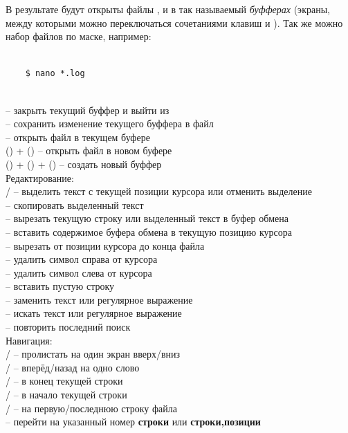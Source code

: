 В результате будут открыты файлы ,  и  в так называемый \textit{буфферах} (экраны, между которыми можно переключаться сочетаниями клавиш  и ). Так же можно набор файлов по маске, например:
\begin{lstlisting}
	
	$ nano *.log
	
\end{lstlisting}	

\noindent
{} -- закрыть текущий буффер и выйти из \\
 -- сохранить изменение текущего буффера в файл\\
 -- открыть файл в текущем буфере\\
()  + () -- открыть файл в новом буфере\\
()  + () + () -- создать новый буффер\\


\noindent
{\large{Редактирование:}}\\
/ -- выделить текст с текущей позиции курсора или отменить выделение\\
 -- скопировать выделенный текст\\
 -- вырезать текущую строку или выделенный текст в буфер обмена\\
 -- вставить содержимое буфера обмена в текущую позицию курсора\\
 -- вырезать от позиции курсора до конца файла\\
 -- удалить символ справа от курсора\\
 -- удалить символ слева от курсора\\
 -- вставить пустую строку\\
 -- заменить текст или регулярное выражение\\
 -- искать текст или регулярное выражение\\
 -- повторить последний поиск\\

\noindent
{\large{Навигация:}}\\
/ -- пролистать на один экран вверх/вниз\\
/ -- вперёд/назад  на одно слово\\
/ -- в конец текущей строки\\
/ -- в начало текущей строки\\
/\keys{ / }  -- на первую/последнюю строку файла\\
 -- перейти на указанный номер \textbf{строки} или \textbf{строки,позиции}\\


